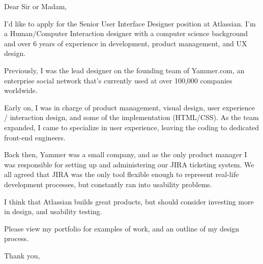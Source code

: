 \documentclass{letter}
\begin{document}
\address{2600 Bryant Street, Apt 2 \\ San Francisco CA 94110 \\ ilya.yakubovich@gmail.com \\ http://yak.nu}

\signature{Ilya Yakubovich}


\makeatletter
\let\@texttop\relax
\makeatother

\begin{letter}{Dear Sir or Madam,}


I'd like to apply for the Senior User Interface Designer position at Atlassian. I'm a Human/Computer Interaction designer with a computer science background and over 6 years of experience in development, product management, and UX design.

Previously, I was the lead designer on the founding team of Yammer.com, an enterprise social network that's currently used at over 100,000 companies worldwide.

Early on, I was in charge of product management, visual design, user experience / interaction design, and some of the implementation (HTML/CSS). As the team expanded, I came to specialize in user experience, leaving the coding to dedicated front-end engineers.

Back then, Yammer was a small company, and as the only product manager I was responsible for setting up and administering our JIRA ticketing system. We all agreed that JIRA was the only tool flexible enough to represent real-life development processes, but constantly ran into usability problems. 

I think that Atlassian builds great products, but should consider investing more in design, and usability testing.

Please view my portfolio for examples of work, and an outline of my design process.

\closing{Thank you,}
\end{letter}
\end{document}
